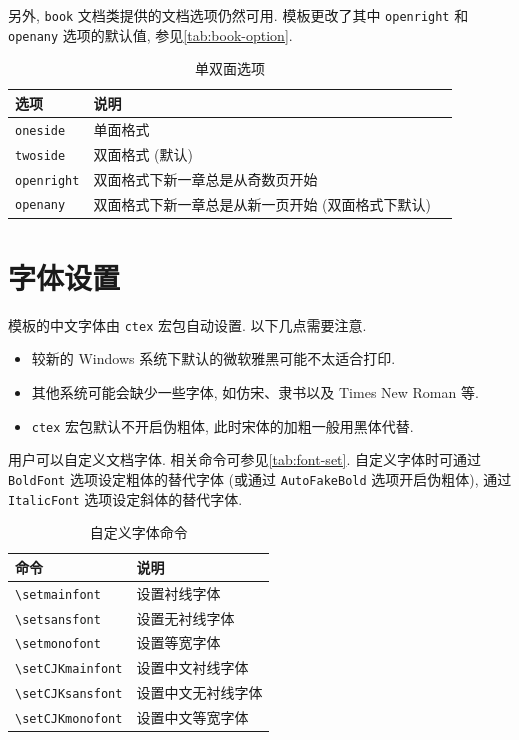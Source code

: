另外, \verb|book| 文档类提供的文档选项仍然可用.
模板更改了其中 \verb|openright| 和 \verb|openany| 选项的默认值,
参见\autoref{tab:book-option}.

\begin{table}[!htb]
  \caption{单双面选项}
  \label{tab:book-option}
  \centering
  \begin{tabular}{lp{16em}l}
    \toprule
    选项             & 说明\\
    \midrule
    \verb|oneside|   & 单面格式\\
    \verb|twoside|   & 双面格式 (默认)\\
    \midrule
    \verb|openright| & 双面格式下新一章总是从奇数页开始\\
    \verb|openany|   & 双面格式下新一章总是从新一页开始
                       (双面格式下默认)\\
    \bottomrule
  \end{tabular}
\end{table}

\section{字体设置}

模板的中文字体由 \verb|ctex| 宏包自动设置.
以下几点需要注意.

\begin{itemize}
  \item
    较新的 Windows 系统下默认的微软雅黑可能不太适合打印.
  \item
    其他系统可能会缺少一些字体, 如仿宋、隶书以及 Times New Roman 等.
  \item
    \verb|ctex| 宏包默认不开启伪粗体, 此时宋体的加粗一般用黑体代替.
\end{itemize}

用户可以自定义文档字体.
相关命令可参见\autoref{tab:font-set}.
自定义字体时可通过 \verb|BoldFont| 选项设定粗体的替代字体
(或通过 \verb|AutoFakeBold| 选项开启伪粗体),
通过 \verb|ItalicFont| 选项设定斜体的替代字体.

\begin{table}[!htb]
  \caption{自定义字体命令}
  \label{tab:font-set}
  \centering
  \begin{tabular}{ll}
    \toprule
    命令                   & 说明\\
    \midrule
    \verb|\setmainfont|    & 设置衬线字体\\
    \verb|\setsansfont|    & 设置无衬线字体\\
    \verb|\setmonofont|    & 设置等宽字体\\
    \midrule
    \verb|\setCJKmainfont| & 设置中文衬线字体\\
    \verb|\setCJKsansfont| & 设置中文无衬线字体\\
    \verb|\setCJKmonofont| & 设置中文等宽字体\\
    \bottomrule
  \end{tabular}
\end{table}

